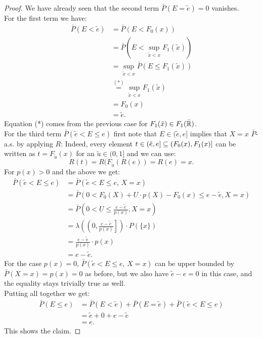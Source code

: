 \begin{Lem}
\begin{proof}
%
We have already seen that the second term $\bar P(E=\tilde e) =0$ vanishes.\\
For the first term we have:
\begin{align*}
 \bar P(E < \tilde e)
    &= \bar P(E < F_0(x) ) \\
    &=  \bar P( E < \sup_{\tilde{x} < x}F_1(\tilde{x}) ) \\
    &= \sup_{\tilde{x} < x} \bar P( E \le F_1(\tilde{x}) ) \\
    &\stackrel{(*)}{=} \sup_{\tilde{x} < x}  F_1(\tilde{x}) \\
    &= F_0(x)\\
    &= \tilde e.
\end{align*}
Equation (*) comes from the previous case for $F_1(\tilde x) \in F_1(\bar{\mathbb{R}})$.\\
For the third term $\bar P(\tilde e< E \le e)$ first note that $E \in (\tilde e,e]$ implies that $X=x$ $\bar P$-a.s. by applying $R$: Indeed, every element 
$t \in (\tilde e,e] \subseteq (F_0(x),F_1(x)]$ can be written as $t=F_{\tilde u}(x)$ for an $\tilde u \in (0,1]$ and we can use:
\[ R(t)=R(F_{\tilde u}(R(e))=R(e)=x.\]
For $p(x)>0$ and the above we get:
\begin{align*}
   \bar P(\tilde e< E \le e) 
 &= \bar P(\tilde e< E \le e,\, X=x)\\
  &= \bar P( 0< F_0(X)+U\cdot p(X) - F_0(x) \le e-\tilde e, X=x) \\
 &= \bar P( 0< U \le  \frac{e-\tilde e}{p(x)}, X=x) \\
 &= \lambda\left( \left(0,  \frac{e-\tilde e}{p(x)} \right]\right) \cdot P(\{x\}) \\
 &= \frac{e-\tilde e}{p(x)} \cdot p(x) \\
 &= e-\tilde e.
\end{align*}
For the case $p(x)=0$, $\bar P(\tilde e< E \le e,\, X=x)$ can be upper bounded by $\bar P(X=x)=p(x)=0$ as before, but we also have $\tilde e - e=0$ in this case, and the equality stays trivially true as well.\\
Putting all together we get:
    \begin{align*}
 \bar P(E \le e) &= \bar P(E < \tilde e) + \bar P(E=\tilde e) + \bar P(\tilde e< E \le e) \\
                         &= \tilde e + 0 + e - \tilde e\\
                         &= e.
    \end{align*}
This shows the claim.
\end{proof}
\end{Lem}


